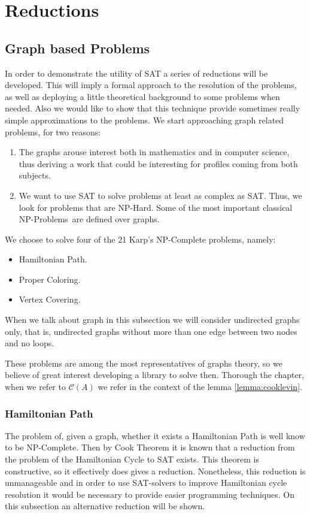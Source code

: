 \section{Reductions}
\subsection{Graph based Problems}
In order to demonstrate the utility of SAT a series of reductions will be developed. This will imply a formal approach to the resolution of the problems, as well as deploying a little theoretical background to some problems when needed. Also we would like to show that this technique provide sometimes really simple approximations to the problems. We start approaching graph related problems, for two reasons:

\begin{enumerate}
\item The graphs arouse interest both in mathematics and in computer science, thus deriving a work that could be interesting for profiles coming from both subjects.
\item We want to use SAT to solve problems at least as complex as SAT. Thus, we look for problems that are NP-Hard. Some of the most important classical NP-Problems\ are defined over graphs. 
\end{enumerate}
 
We choose to solve four of the 21 Karp's NP-Complete problems\cite{karp1972reducibility}, namely:
\begin{itemize}
\item Hamiltonian Path.
\item Proper Coloring.
\item Vertex Covering.
\end{itemize}

When we talk about graph in this subsection we will consider undirected graphs only, that is, undirected graphs without more than one edge between two nodes and no loops.

These problems are among the most representatives of graphs theory, so we believe of great interest developing a library to solve then. Thorough the chapter, when we refer to $\mathcal{C}(A)$ we refer in the context of the lemma \ref{lemma:cooklevin}.


\subsubsection{Hamiltonian Path}

The problem of, given a graph, whether it exists a Hamiltonian Path is well know to be NP-Complete. Then by Cook Theorem it is known that a reduction from the problem of the Hamiltonian Cycle to SAT exists. This theorem is constructive, so it effectively does gives a reduction. Nonetheless, this reduction is unmanageable and in order to use SAT-solvers to improve Hamiltonian cycle resolution it would be necessary to provide easier programming techniques. On this subsection an alternative reduction will be shown.

